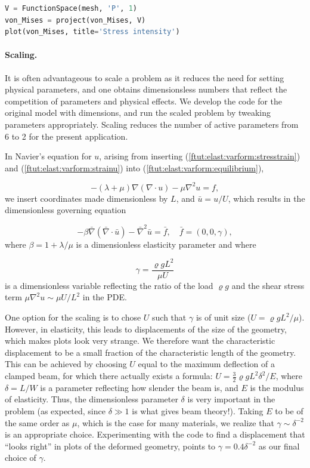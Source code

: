 \documentclass[graybox,envcountchap,sectrefs,final]{svmonodo}
\begin{document}
\begin{lstlisting}[language=Python,style=graycolor]
V = FunctionSpace(mesh, 'P', 1)
von_Mises = project(von_Mises, V)
plot(von_Mises, title='Stress intensity')
\end{lstlisting}

\paragraph{Scaling.}

It is often
advantageous to scale a problem as it reduces the need for setting
physical parameters, and one obtains dimensionsless numbers that
reflect the competition of parameters and physical effects. We develop
the code for the original model with dimensions, and run the scaled
problem by tweaking parameters appropriately. Scaling reduces the
number of active parameters from 6 to 2 for the present application.

In Navier's equation for $u$, arising from inserting
(\ref{ftut:elast:varform:stresstrain}) and
(\ref{ftut:elast:varform:strainu}) into
(\ref{ftut:elast:varform:equilibrium}),

\[ -(\lambda + \mu)\nabla(\nabla\cdot u) - \mu\nabla^2 u = f,\]
we insert coordinates made dimensionless by $L$, and $\bar u=u/U$,
which results in the dimensionless governing equation

\[
-\beta\bar\nabla(\bar\nabla\cdot \bar u) - \bar\nabla^2 \bar u =
\bar f,\quad \bar f = (0,0,\gamma),\]
where $\beta = 1 + \lambda/\mu$ is a dimensionless elasticity parameter and
where

\[ \gamma = \frac{\varrho gL^2}{\mu U}\]
is a dimensionless variable reflecting the ratio of the load
$\varrho g$ and the shear stress
term $\mu\nabla^2 u\sim \mu U/L^2$ in the PDE.

One option for the scaling is to chose $U$ such that $\gamma$ is of
unit size ($U = \varrho gL^2/\mu$). However, in elasticity, this leads
to displacements of the size of the geometry, which makes plots
look very strange. We therefore want the characteristic displacement
to be a small fraction of the characteristic length of the geometry.
This can be achieved by choosing $U$ equal to the maximum deflection
of a clamped beam, for which there actually exists a formula: $U =
\frac{3}{2}\varrho gL^2\delta^2/E$, where $\delta = L/W$ is a
parameter reflecting how slender the beam is, and $E$ is the modulus
of elasticity. Thus, the dimensionless parameter $\delta$ is very
important in the problem (as expected, since $\delta\gg 1$ is what
gives beam theory!).  Taking $E$ to be of the same order as $\mu$,
which is the case for many materials, we realize that $\gamma \sim
\delta^{-2}$ is an appropriate choice.  Experimenting with the code to
find a displacement that ``looks right'' in plots of the deformed
geometry, points to $\gamma = 0.4\delta^{-2}$ as our final choice of
$\gamma$.
\end{document}
